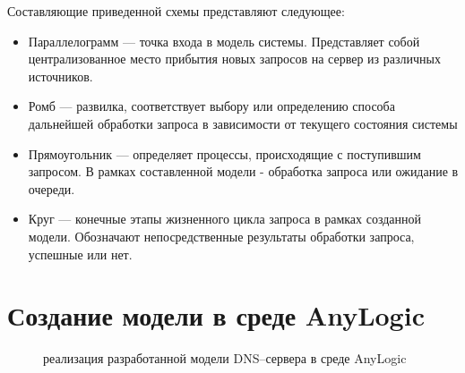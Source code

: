 Составляющие приведенной схемы представляют следующее:
\begin{itemize}
    \item Параллелограмм --- точка входа в модель системы. Представляет собой централизованное
    место прибытия новых запросов на сервер из различных источников.
    \item Ромб --- развилка, соответствует выбору или определению способа дальнейшей
    обработки запроса в зависимости от текущего состояния системы
    \item Прямоугольник --- определяет процессы, происходящие с поступившим запросом.
    В рамках составленной модели - обработка запроса или ожидание в очереди. 
    \item Круг --- конечные этапы жизненного цикла запроса в рамках созданной модели.
    Обозначают непосредственные результаты обработки запроса, успешные или нет.
\end{itemize}
\newpage

\section{Создание модели в среде AnyLogic}
\begin{figure} [h]
    \caption{реализация разработанной модели DNS--сервера в среде AnyLogic}
\end{figure}


